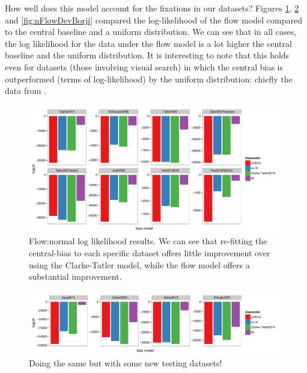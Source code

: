 \documentclass[a4paper, twocolumn, oneside, 10pt]{article}
\begin{document}
How well does this model account for the fixations in our datasets? Figures \ref{fig:nFlowDevAll}, \ref{fig:nFlowDevAll2} and \ref{fig:nFlowDevBorji} compared the log-likelihood of the flow model compared to the \cite{clarke-tatler2014} central baseline and a uniform distribution. We can see that in all cases, the log likelihood for the data under the flow model is a lot higher the central baseline and the uniform distribution. It is interesting to note that this holds even for datasets (those involving visual search) in which the central bias is outperformed (terms of log-likelihood) by the uniform distribution: chiefly the data from \cite{clarke2009,asher2013,tatler2007}. 



\begin{figure}
\centering
 \includegraphics[width=12cm]{../scripts/flow/figs/llh_training.pdf}
\caption{Flow:normal log likelihood results. We can see that re-fitting the central-bias to each specific dataset offers little improvement over using the Clarke-Tatler model, while the flow model offers a substantial improvement.}
\label{fig:nFlowDevAll}
\end{figure}

\begin{figure}
\centering
\includegraphics[width=12cm]{../scripts/flow/figs/llh_testing.pdf}
\caption{Doing the same but with some new testing datasets!}
\label{fig:nFlowDevAll2}
\end{figure}
\end{document}
